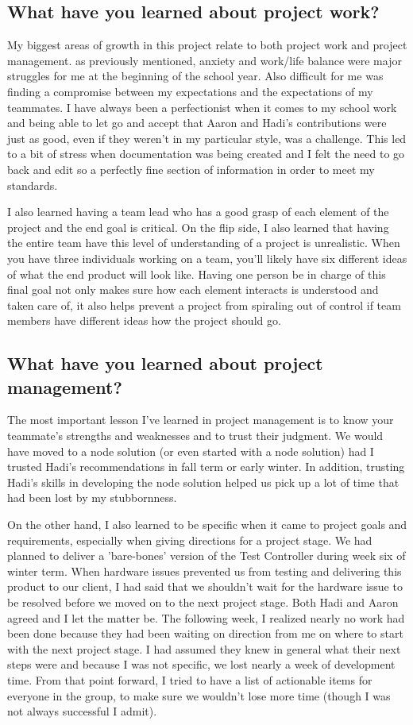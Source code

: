 \documentclass[onecolumn, draftclsnofoot,10pt, compsoc]{report}
\begin{document}
\subsection{What have you learned about project work?}
My biggest areas of growth in this project relate to both project work and project management. as previously mentioned, anxiety and work/life balance were major struggles for me at the beginning of the school year. Also difficult for me was finding a compromise between my expectations and the expectations of my teammates. I have always been a perfectionist when it comes to my school work and being able to let go and accept that Aaron and Hadi's contributions were just as good, even if they weren't in my particular style, was a challenge. This led to a bit of stress when documentation was being created and I felt the need to go back and edit so a perfectly fine section of information in  order to meet my standards.

I also learned having a team lead who has a good grasp of each element of the project and the end goal is critical. On the flip side, I also learned that having the entire team have this level of understanding of a project is unrealistic. When you have three individuals working on a team, you'll likely have six different ideas of what the end product will look like. Having one person be in charge of this final goal not only makes sure how each element interacts is understood and taken care of, it also helps prevent a project from spiraling out of control if team members have different ideas how the project should go. 
\subsection{What have you learned about project management?}
The most important lesson I've learned in project management is to know your teammate's strengths and weaknesses and to trust their judgment. We would have moved to a node solution (or even started with a node solution) had I trusted Hadi's recommendations in fall term or early winter. In addition, trusting Hadi's skills in developing the node solution helped us pick up a lot of time that had been lost by my stubbornness.

On the other hand, I also learned to be specific when it came to project goals and requirements, especially when giving directions for a project stage. We had planned to deliver a 'bare-bones' version of the Test Controller during week six of winter term. When hardware issues prevented us from testing and delivering this product to our client, I had said that we shouldn't wait for the hardware issue to be resolved before we moved on to the next project stage. Both Hadi and Aaron agreed and I let the matter be. The following week, I realized nearly no work had been done because they had been waiting on direction from me on where to start with the next project stage. I had assumed they knew in general what their next steps were and because I was not specific, we lost nearly a week of development time. From that point forward, I tried to have a list of actionable items for everyone in the group, to make sure we wouldn't lose more time (though I was not always successful I admit). 
\end{document}
